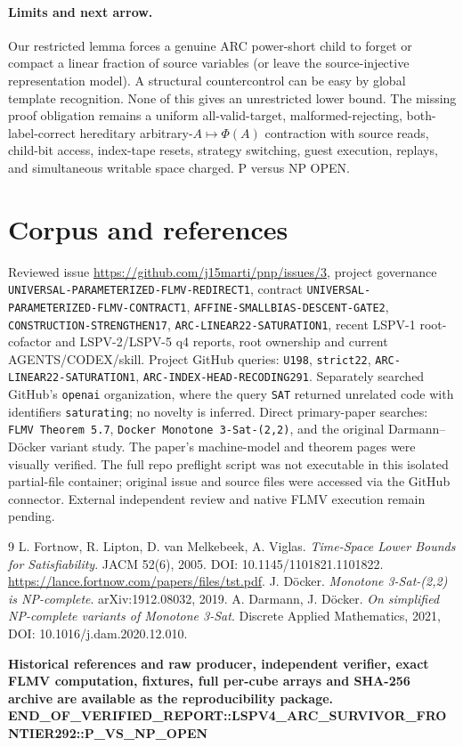 \documentclass[10pt]{article}
\begin{document}
\paragraph{Limits and next arrow.} Our restricted lemma forces a genuine ARC power-short child to forget or compact a linear fraction of source variables (or leave the source-injective representation model). A structural countercontrol can be easy by global template recognition. None of this gives an unrestricted lower bound. The missing proof obligation remains a uniform all-valid-target, malformed-rejecting, both-label-correct hereditary arbitrary-$A\mapsto\Phi(A)$ contraction with source reads, child-bit access, index-tape resets, strategy switching, guest execution, replays, and simultaneous writable space charged. P versus NP OPEN.

\section{Corpus and references}
Reviewed issue \url{https://github.com/j15marti/pnp/issues/3}, project governance \texttt{UNIVERSAL-PARAMETERIZED-FLMV-REDIRECT1}, contract \texttt{UNIVERSAL-PARAMETERIZED-FLMV-CONTRACT1}, \texttt{AFFINE-SMALLBIAS-DESCENT-GATE2}, \texttt{CONSTRUCTION-STRENGTHEN17}, \texttt{ARC-LINEAR22-SATURATION1}, recent LSPV-1 root-cofactor and LSPV-2/LSPV-5 q4 reports, root ownership and current AGENTS/CODEX/skill. Project GitHub queries: \texttt{U198}, \texttt{strict22}, \texttt{ARC-LINEAR22-SATURATION1}, \texttt{ARC-INDEX-HEAD-RECODING291}. Separately searched GitHub's \texttt{openai} organization, where the query \texttt{SAT} returned unrelated code with identifiers \texttt{saturating}; no novelty is inferred. Direct primary-paper searches: \texttt{FLMV Theorem 5.7}, \texttt{Docker Monotone 3-Sat-(2,2)}, and the original Darmann--D\"ocker variant study. The paper's machine-model and theorem pages were visually verified. The full repo preflight script was not executable in this isolated partial-file container; original issue and source files were accessed via the GitHub connector. External independent review and native FLMV execution remain pending.

\begin{thebibliography}{9}
 L. Fortnow, R. Lipton, D. van Melkebeek, A. Viglas. \emph{Time-Space Lower Bounds for Satisfiability}. JACM 52(6), 2005. DOI: 10.1145/1101821.1101822. \url{https://lance.fortnow.com/papers/files/tst.pdf}.
 J. D\"ocker. \emph{Monotone 3-Sat-(2,2) is NP-complete}. arXiv:1912.08032, 2019.
 A. Darmann, J. D\"ocker. \emph{On simplified NP-complete variants of Monotone 3-Sat}. Discrete Applied Mathematics, 2021, DOI: 10.1016/j.dam.2020.12.010.
\end{thebibliography}
\noindent \textbf{Historical references and raw producer, independent verifier, exact FLMV computation, fixtures, full per-cube arrays and SHA-256 archive are available as the reproducibility package.}\\
\textbf{END\_OF\_VERIFIED\_REPORT::LSPV4\_ARC\_SURVIVOR\_FRONTIER292::P\_VS\_NP\_OPEN}
\end{document}

